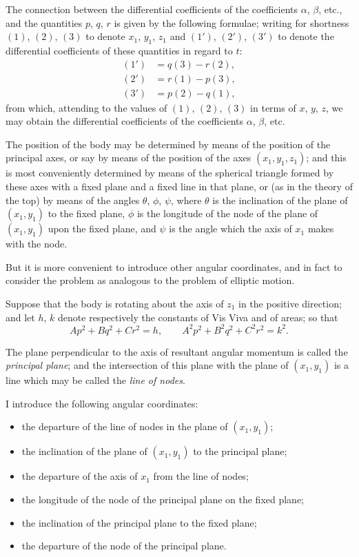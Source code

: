 \documentclass[11pt,a4paper]{book}
\begin{document}
{{The connection between the differential coefficients of the coefficients $\alpha$, $\beta$, etc., and the quantities $p$, $q$, $r$ is given by the following formulae; writing for shortness $(1)$, $(2)$, $(3)$ to denote $x_1$, $y_1$, $z_1$ and $(1')$, $(2')$, $(3')$ to denote the differential coefficients of these quantities in regard to $t$:
\begin{align*}
(1') &= q(3) - r(2), \\
(2') &= r(1) - p(3), \\
(3') &= p(2) - q(1),
\end{align*}
from which, attending to the values of $(1)$, $(2)$, $(3)$ in terms of $x$, $y$, $z$, we may obtain the differential coefficients of the coefficients $\alpha$, $\beta$, etc.

The position of the body may be determined by means of the position of the principal axes, or say by means of the position of the axes $(x_1, y_1, z_1)$; and this is most conveniently determined by means of the spherical triangle formed by these axes with a fixed plane and a fixed line in that plane, or (as in the theory of the top) by means of the angles $\theta$, $\phi$, $\psi$, where $\theta$ is the inclination of the plane of $(x_1, y_1)$ to the fixed plane, $\phi$ is the longitude of the node of the plane of $(x_1, y_1)$ upon the fixed plane, and $\psi$ is the angle which the axis of $x_1$ makes with the node.

But it is more convenient to introduce other angular coordinates, and in fact to consider the problem as analogous to the problem of elliptic motion.

Suppose that the body is rotating about the axis of $z_1$ in the positive direction; and let $h$, $k$ denote respectively the constants of Vis Viva and of areas; so that
\[
Ap^2 + Bq^2 + Cr^2 = h, \qquad A^2p^2 + B^2q^2 + C^2r^2 = k^2.
\]

The plane perpendicular to the axis of resultant angular momentum is called the \textit{principal plane}; and the intersection of this plane with the plane of $(x_1, y_1)$ is a line which may be called the \textit{line of nodes}.

I introduce the following angular coordinates:
\begin{itemize}
\item[$T$,] the departure of the line of nodes in the plane of $(x_1, y_1)$;
\item[$S$,] the inclination of the plane of $(x_1, y_1)$ to the principal plane;
\item[$F$,] the departure of the axis of $x_1$ from the line of nodes;
\item[$\theta$,] the longitude of the node of the principal plane on the fixed plane;
\item[$\phi$,] the inclination of the principal plane to the fixed plane;
\item[$\sigma$,] the departure of the node of the principal plane.
\end{itemize}

}}
\end{document}
